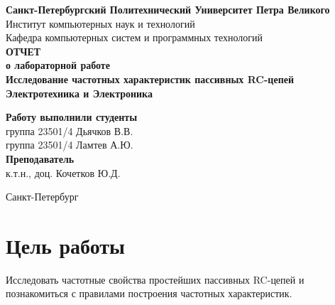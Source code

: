 \documentclass[a4paper,14pt]{extarticle}
\newcommand{\sign}[1][5cm]{\makebox[#1]{\hrulefill}} %
\begin{document}
\begin{titlepage}
	\begin{center}
		\textbf{Санкт-Петербургский Политехнический Университет Петра Великого}\\[0.3cm]
		\small Институт компьютерных наук и технологий \\[0.3cm]
		\small Кафедра компьютерных систем и программных технологий\\[4cm]
		
		\textbf{ОТЧЕТ}\\ \textbf{о лабораторной работе}\\[0.5cm]
		\textbf{Исследование частотных характеристик пассивных RC-цепей}\\[0.1cm]
		\textbf{Электротехника и Электроника}\\[10.5cm]
	\end{center}
	
	\begin{flushright}
		\begin{minipage}{0.60\textwidth}
			\begin{flushleft}
				\small \textbf{Работу выполнили студенты}\\[3mm]
				\small группа 23501/4 \hspace*{17mm} Дьячков В.В.\\[3mm]
				\small группа 23501/4 \hspace*{17mm} Ламтев А.Ю.\\[5mm]
				
				\small \textbf{Преподаватель}\\[5mm]
			 	\small \sign[3.5cm] \hspace*{8mm} к.т.н., доц. Кочетков Ю.Д.\\[0.5cm]
			\end{flushleft}
		\end{minipage}
	\end{flushright}
	
	\vfill
	
	\begin{center}
		\small Санкт-Петербург\\
		\small \the\year
	\end{center}
\end{titlepage}

\section{Цель работы}

Исследовать частотные свойства простейших пассивных RC­-цепей и познакомиться с правилами построения частотных характеристик.
\end{document}
